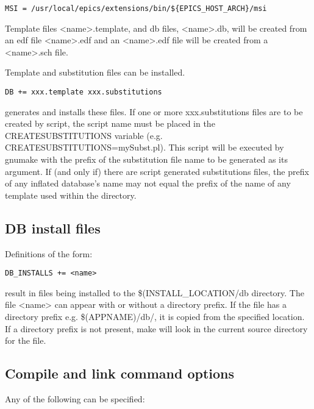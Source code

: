 \begin{verbatim}MSI = /usr/local/epics/extensions/bin/${EPICS_HOST_ARCH}/msi
\end{verbatim}
Template files \textless{}name\textgreater{}.template, and db files, \textless{}name\textgreater{}.db, will be created from an edf file \textless{}name\textgreater{}.edf and an 
\textless{}name\textgreater{}.edf file will be created from a \textless{}name\textgreater{}.sch file.

Template and substitution files can be installed.

\begin{verbatim}DB += xxx.template xxx.substitutions
\end{verbatim}
generates and installs these files. If one or more xxx.substitutions files are to be created by script, the script name must be 
placed in the CREATESUBSTITUTIONS variable (e.g. CREATESUBSTITUTIONS=mySubst.pl). This script will be 
executed by gnumake with the prefix of the substitution file name to be generated as its argument. If (and only if) there 
are script generated substitutions files, the prefix of any inflated database's name may not equal the prefix of the name of 
any template used within the directory.

\subsection{DB install files}

Definitions of the form:

\begin{verbatim}DB_INSTALLS += <name>
\end{verbatim}result in files being installed to the \$(INSTALL\_LOCATION/db directory. The file \textless{}name\textgreater{} can appear with or without a 
directory prefix. If the file has a directory prefix e.g. \$(APPNAME)/db/, it is copied from the specified location. If a 
directory prefix is not present, make will look in the current source directory for the file.

\subsection{Compile and link command options}

Any of the following can be specified:

